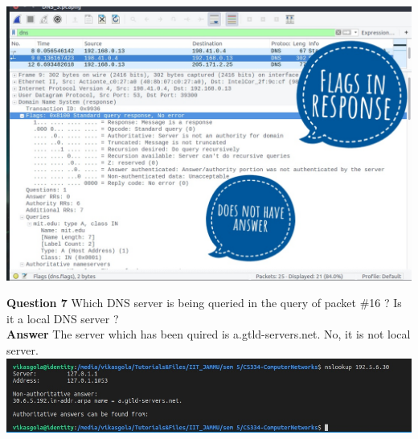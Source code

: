 \documentclass[14pt]{extarticle}
\begin{document}
    \includegraphics[scale=0.45]{3_6_2}\\[10pt]
    \vspace{1cm}


    \noindent
    \textbf{\large Question 7}
    Which DNS server is being queried in the query of packet \#16 ? Is it a local DNS server ?\\[10pt]
    \textbf{\large Answer}
    The server which has been quired is a.gtld-servers.net. No, it is not local server.\\[10pt]
    \includegraphics[scale=0.45]{3_7_1}\\[10pt]
    \vspace{1cm}
\end{document}
